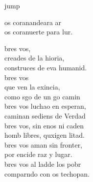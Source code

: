 \begin{cancion}jump\\
	\begin{chorus}%
		os coranandeara ar\\
		os coranuerte para lur.\jump\\
	\end{chorus}%
	bres vos, \\
	creades de la hioria,\\
	construces de eva humanid.\\
	bres vos \\
	que ven la exincia,\\
	como sgo de un go camin \\
	\jump
	bres vos luchao en esperan,\\
	caminan sediens de Verdad \\
	bres vos, sin enos ni caden \\
	homb libres, quxigen litad.\\
	\jump
	bres vos aman sin fronter,\\
	por encide raz y lugar.  \\
	bres vos al ladde los pobr \\
	comparndo con os techopan.\\
	\jump
\end{cancion}%
